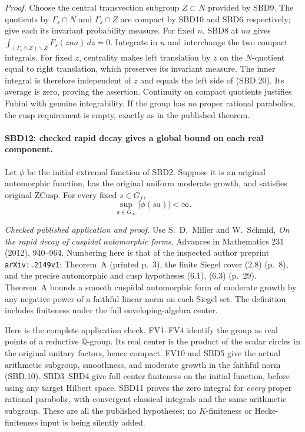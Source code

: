 \documentclass[11pt,a4paper]{article}
\numberwithin{equation}{section}
\theoremstyle{remark}\newtheorem{remark}[theorem]{Remark}
\begin{document}
\emph{Proof.}
Choose the central transvection subgroup \(Z\subset N\)
provided by SBD9.  The quotients by \(\Gamma_s\cap N\) and
\(\Gamma_s\cap Z\) are compact by SBD10 and SBD6 respectively;
give each its invariant probability measure.  For fixed \(n\),
SBD8 at \(na\) gives
\(\int_{(\Gamma_s\cap Z)\backslash Z}F_s(zna)\,dz=0\).
Integrate in \(n\) and interchange the two compact integrals.
For fixed \(z\), centrality makes left translation by \(z\)
on the \(N\)-quotient equal to right translation, which
preserves its invariant measure.  The inner integral is
therefore independent of \(z\) and equals the left side of
(SBD.20).  Its average is zero, proving the assertion.
Continuity on compact quotients justifies Fubini with genuine
integrability.  If the group has no proper rational parabolics,
the cusp requirement is empty, exactly as in the published
theorem.

\paragraph{SBD12: checked rapid decay gives a global bound on each real component.}
\label{claim:SBD12}
Let \(\phi\) be the initial extremal function of SBD2.  Suppose
it is an original automorphic function, has the original
uniform moderate growth, and satisfies original \(\mathrm{ZCusp}\).
For every fixed \(s\in G_f\),
\[
                   \sup_{a\in G_\infty}|\phi(sa)|<\infty.
 \tag{SBD.21}
\]

\emph{Checked published application and proof.}
Use S.~D.~Miller and W.~Schmid, \emph{On the rapid decay of
cuspidal automorphic forms}, Advances in Mathematics 231 (2012),
940--964.  Numbering here is that of the inspected author
preprint \texttt{ar\allowbreak Xiv:.\allowbreak 2149v1}: Theorem~A (printed p.~3),
the finite Siegel cover (2.8) (p.~8), and the precise
automorphic and cusp hypotheses (6.1), (6.3) (p.~29).
Theorem~A bounds a smooth cuspidal automorphic form of moderate
growth by any negative power of a faithful linear norm on each
Siegel set.  The definition includes finiteness under the full
enveloping-algebra center.

Here is the complete application check.  FV1--FV4 identify the
group as real points of a reductive \(\mathbb Q\)-group.  Its
real center is the product of the scalar circles in the original
unitary factors, hence compact.  FV10 and SBD5 give the actual
arithmetic subgroup, smoothness, and moderate growth in the
faithful norm (SBD.10).  SBD3--SBD4 give full center finiteness
on the initial function, before using any target Hilbert space.
SBD11 proves the zero integral for \emph{every} proper rational
parabolic, with convergent classical integrals and the same
arithmetic subgroup.  These are all the published hypotheses;
no \(K\)-finiteness or Hecke-finiteness input is being silently
added.
\end{document}
